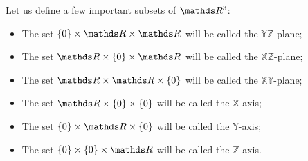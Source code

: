 \begin{df}
	Let us define a few important subsets of $\R^3$:
	\begin{itemize}
		\item The set $\{0\}\times \R\times \R$ will be called the $\mathds{YZ}$-plane;
		\item The set $\R\times\{0\}\times \R$ will be called the $\mathds{XZ}$-plane;
		\item The set $\R\times \R\times \{0\}$ will be called the $\mathds{XY}$-plane;
		\item The set $\R\times\{0\}\times \{0\}$ will be called the $\mathds{X}$-axis;
		\item The set $\{0\}\times \R\times\{0\}$ will be called the $\mathds{Y}$-axis;
		\item The set $\{0\}\times\{0\}\times \R$ will be called the $\mathds{Z}$-axis.
	\end{itemize}
\end{df}